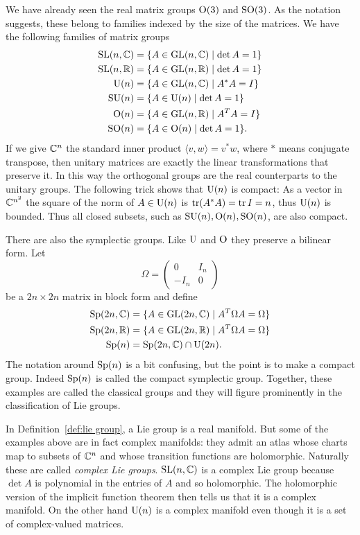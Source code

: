 We have already seen the real matrix groups $\mathrm{O}(3)$ and $\mathrm{SO}(3)$.
As the notation suggests, these belong to families indexed by the size of the matrices.
We have the following families of matrix groups
\begin{align*}
\mathrm{SL}(n,\mathbb{C}) &= \{ A \in \mathrm{GL}(n,\mathbb{C}) \mid \det A = 1 \} \\
\mathrm{SL}(n,\mathbb{R}) &= \{ A \in \mathrm{GL}(n,\mathbb{R}) \mid \det A = 1 \} \\
\mathrm{U}(n) &= \{ A \in \mathrm{GL}(n,\mathbb{C}) \mid A^\ast A = I \} \\
\mathrm{SU}(n) &= \{ A \in \mathrm{U}(n) \mid \det A = 1 \} \\
\mathrm{O}(n) &= \{ A \in \mathrm{GL}(n,\mathbb{R}) \mid A^T A = I \} \\
\mathrm{SO}(n) &= \{ A \in \mathrm{O}(n) \mid \det A = 1 \}.
\end{align*}
If we give $\mathbb{C}^n$ the standard inner product $\langle v,w \rangle = v^\ast w$, where $\ast$ means conjugate transpose, then unitary matrices are exactly the linear transformations that preserve it.
In this way the orthogonal groups are the real counterparts to the unitary groups.
The following trick shows that $\mathrm{U}(n)$ is compact: As a vector in $\mathbb{C}^{n^2}$ the square of the norm of $A \in \mathrm{U}(n)$ is $\operatorname{tr}(A^\ast A) = \operatorname{tr} I = n$, thus $\mathrm{U}(n)$ is bounded.
Thus all closed subsets, such as $\mathrm{SU}(n), \mathrm{O}(n),\mathrm{SO}(n)$, are also compact.

There are also the symplectic groups.
Like $\mathrm{U}$ and $\mathrm{O}$ they preserve a bilinear form.
Let 
\[
\Omega = \begin{pmatrix}
0 & I_n \\ - I_n & 0
\end{pmatrix}
\]
be a $2n\times 2n$ matrix in block form and define
\begin{align*}
\mathrm{Sp}(2n,\mathbb{C}) &= \{ A \in \mathrm{GL}(2n,\mathbb{C}) \mid A^T\Omega A = \Omega \} \\
\mathrm{Sp}(2n,\mathbb{R}) &= \{ A \in \mathrm{GL}(2n,\mathbb{R}) \mid A^T\Omega A = \Omega \} \\
\mathrm{Sp}(n) &= \mathrm{Sp}(2n,\mathbb{C}) \cap \mathrm{U}(2n).
\end{align*}
The notation around $\mathrm{Sp}(n)$ is a bit confusing, but the point is to make a compact group.
Indeed $\mathrm{Sp}(n)$ is called the compact symplectic group.
Together, these examples are called the classical groups and they will figure prominently in the classification of Lie groups.

In Definition~\ref{def:lie group}, a Lie group is a real manifold.
But some of the examples above are in fact complex manifolds: they admit an atlas whose charts map to subsets of $\mathbb{C}^n$ and whose transition functions are holomorphic.
Naturally these are called \emph{complex Lie groups}.
$\mathrm{SL}(n,\mathbb{C})$ is a complex Lie group because $\det A$ is polynomial in the entries of $A$ and so holomorphic.
The holomorphic version of the implicit function theorem then tells us that it is a complex manifold.
On the other hand $\mathrm{U}(n)$ is a complex manifold even though it is a set of complex-valued matrices.


